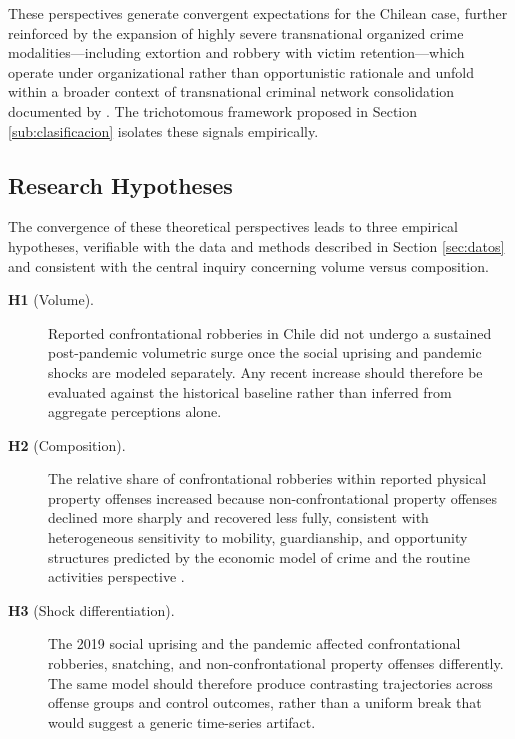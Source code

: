 \documentclass[pdflatex,sn-basic]{sn-jnl}
\begin{document}
These perspectives generate convergent expectations for the Chilean case, further reinforced by the expansion of highly severe transnational organized crime modalities---including extortion and robbery with victim retention---which operate under organizational rather than opportunistic rationale \citep{dammert2025} and unfold within a broader context of transnational criminal network consolidation documented by \citet{greene2023}. The trichotomous framework proposed in Section \ref{sub:clasificacion} isolates these signals empirically.

\subsection{Research Hypotheses}
\label{sub:hipotesis}

The convergence of these theoretical perspectives leads to three empirical hypotheses, verifiable with the data and methods described in Section \ref{sec:datos} and consistent with the central inquiry concerning volume versus composition.

\begin{description}
  \item[\textbf{H1} (Volume).] Reported confrontational robberies in Chile did not undergo a sustained post-pandemic volumetric surge once the social uprising and pandemic shocks are modeled separately. Any recent increase should therefore be evaluated against the historical baseline rather than inferred from aggregate perceptions alone.

  \item[\textbf{H2} (Composition).] The relative share of confrontational robberies within reported physical property offenses increased because non-confrontational property offenses declined more sharply and recovered less fully, consistent with heterogeneous sensitivity to mobility, guardianship, and opportunity structures predicted by the economic model of crime \citep{becker1968} and the routine activities perspective \citep{cohen1979}.

  \item[\textbf{H3} (Shock differentiation).] The 2019 social uprising and the pandemic affected confrontational robberies, snatching, and non-confrontational property offenses differently. The same model should therefore produce contrasting trajectories across offense groups and control outcomes, rather than a uniform break that would suggest a generic time-series artifact.
\end{description}
\end{document}

